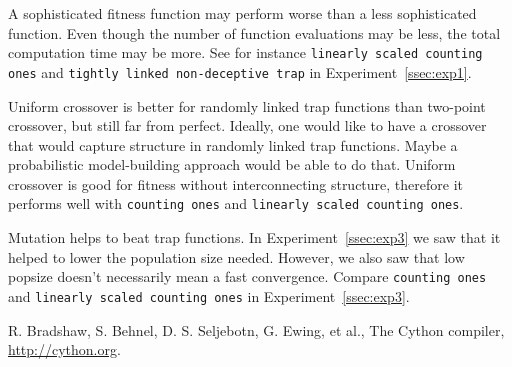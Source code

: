 \documentclass[12pt]{article}
\theoremstyle{definition}
\newcommand{\co}{\texttt{counting ones}}
\newcommand{\lsco}{\texttt{linearly scaled counting ones}}
\newcommand{\tnt}{\texttt{tightly linked non-deceptive trap}}
\begin{document}
A sophisticated fitness function may perform worse than a less sophisticated function.
Even though the number of function evaluations may be less, the total computation time
may be more. See for instance \lsco{} and \tnt{} in Experiment~\ref{ssec:exp1}.

Uniform crossover is better for randomly linked trap functions than two-point crossover,
but still far from perfect.
Ideally, one would like to have a crossover that would capture structure in randomly linked
trap functions.
Maybe a probabilistic model-building approach would be able to do that.
Uniform crossover is good for fitness without interconnecting structure,
therefore it performs well with \co{} and \lsco{}.

Mutation helps to beat trap functions.
In Experiment~\ref{ssec:exp3} we saw that it helped to lower the population size needed.
However, we also saw that low popsize doesn't necessarily mean a fast convergence.
Compare \co{} and \lsco{} in Experiment~\ref{ssec:exp3}.

\begin{thebibliography}{9}

R. Bradshaw, S. Behnel, D. S. Seljebotn, G. Ewing, et al.,
The Cython compiler, \url{http://cython.org}.

\end{thebibliography}
\end{document}
